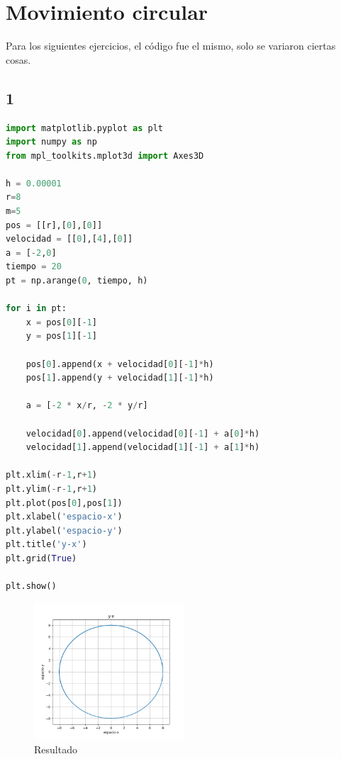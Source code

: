 \documentclass{article}
\begin{document}
\section{Movimiento circular}
Para los siguientes ejercicios, el código fue el mismo, solo se variaron ciertas cosas.
\subsection{1}
\begin{lstlisting}[language=Python,caption=Desafío 1.1]
import matplotlib.pyplot as plt
import numpy as np
from mpl_toolkits.mplot3d import Axes3D

h = 0.00001
r=8
m=5
pos = [[r],[0],[0]]
velocidad = [[0],[4],[0]]
a = [-2,0]
tiempo = 20
pt = np.arange(0, tiempo, h)

for i in pt:
    x = pos[0][-1]
    y = pos[1][-1]

    pos[0].append(x + velocidad[0][-1]*h)
    pos[1].append(y + velocidad[1][-1]*h)

    a = [-2 * x/r, -2 * y/r]

    velocidad[0].append(velocidad[0][-1] + a[0]*h)
    velocidad[1].append(velocidad[1][-1] + a[1]*h)

plt.xlim(-r-1,r+1)
plt.ylim(-r-1,r+1)
plt.plot(pos[0],pos[1])    
plt.xlabel('espacio-x')
plt.ylabel('espacio-y')
plt.title('y-x')
plt.grid(True)

plt.show()
\end{lstlisting}
\begin{figure}[H]
    \centering
    \includegraphics[width=0.5\textwidth]{1.png}
    \caption{Resultado}
\end{figure}
\end{document}
